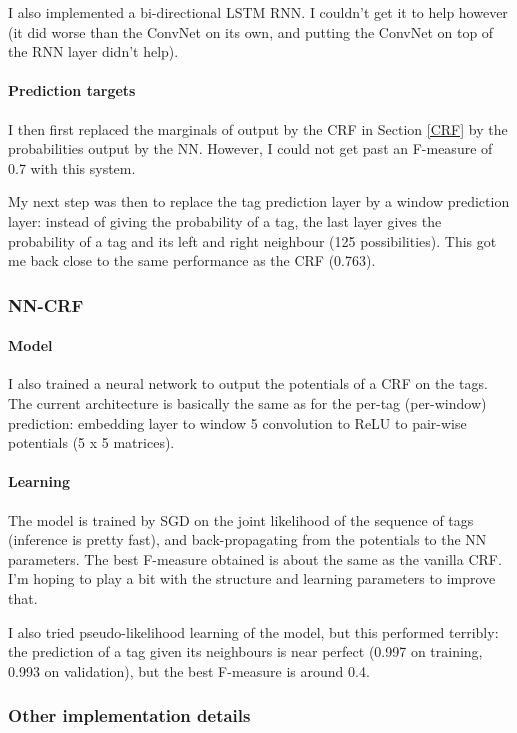 \documentclass[10pt,a4paper]{article}
\begin{document}
  I also implemented a bi-directional LSTM RNN. I couldn't get it to help however (it did worse than the ConvNet on its own, and putting the ConvNet on top of the RNN layer didn't help).

  \paragraph{Prediction targets}

  I then first replaced the marginals of output by the CRF in Section \ref{CRF} by the probabilities output by the NN. However, I could not get past an F-measure of 0.7 with this system.
  
  My next step was then to replace the tag prediction layer by a window prediction layer: instead of giving the probability of a tag, the last layer gives the probability of a tag and its left and right neighbour (125 possibilities). This got me back close to the same performance as the CRF (0.763).

\subsubsection{NN-CRF}

  \paragraph{Model}

  I also trained a neural network to output the potentials of a CRF on the tags. The current architecture is basically the same as for the per-tag (per-window) prediction: embedding layer to window 5 convolution to ReLU to pair-wise potentials (5 x 5 matrices).

  \paragraph{Learning} The model is trained by SGD on the joint likelihood of the sequence of tags (inference is pretty fast), and back-propagating from the potentials to the NN parameters. The best F-measure obtained is about the same as the vanilla CRF. I'm hoping to play a bit with the structure and learning parameters to improve that.
  
  I also tried pseudo-likelihood learning of the model, but this performed terribly: the prediction of a tag given its neighbours is near perfect (0.997 on training, 0.993 on validation), but the best F-measure is around 0.4.

\subsubsection{Other implementation details}
\end{document}
